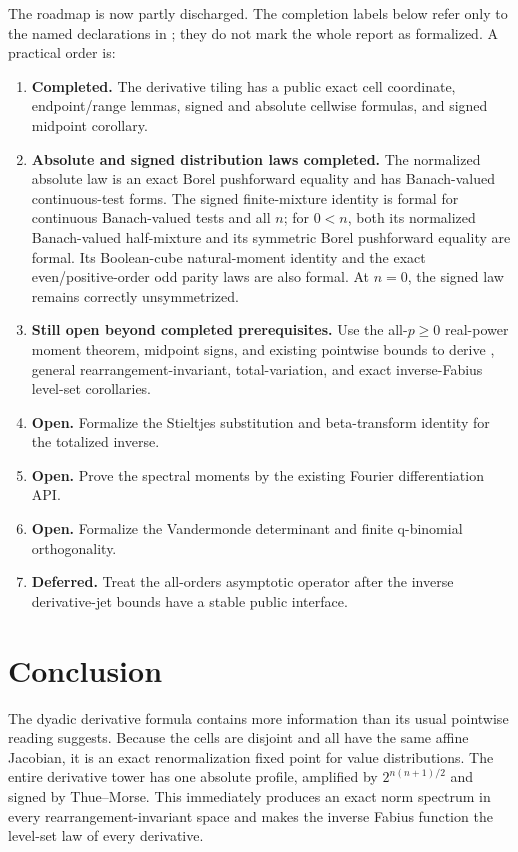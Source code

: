 \documentclass[11pt,oneside]{article}
\theoremstyle{definition}
\theoremstyle{remark}
\begin{document}
The roadmap is now partly discharged.  The completion labels below refer only to the named
declarations in ; they do not mark the whole report
as formalized.  A practical order is:
\begin{enumerate}
\item \textbf{Completed.}  The derivative tiling has a public exact cell coordinate,
      endpoint/range lemmas, signed and absolute cellwise formulas, and signed midpoint
      corollary.
\item \textbf{Absolute and signed distribution laws completed.}  The normalized absolute
      law is an exact Borel pushforward equality and has Banach-valued continuous-test forms.
      The signed finite-mixture identity is formal for continuous Banach-valued tests and all
      \(n\); for \(0<n\), both its normalized Banach-valued half-mixture and its symmetric
      Borel pushforward equality are formal.  Its Boolean-cube natural-moment identity and
      the exact even/positive-order odd parity laws are also formal.  At \(n=0\), the signed
      law remains correctly unsymmetrized.
\item \textbf{Still open beyond completed prerequisites.}  Use the all-\(p\ge0\)
      real-power moment theorem, midpoint signs, and existing pointwise bounds to derive
      , general rearrangement-invariant, total-variation, and exact
      inverse-Fabius level-set corollaries.
\item \textbf{Open.}  Formalize the Stieltjes substitution and beta-transform identity for
      the totalized inverse.
\item \textbf{Open.}  Prove the spectral moments by the existing Fourier differentiation
      API.
\item \textbf{Open.}  Formalize the Vandermonde determinant and finite q-binomial
      orthogonality.
\item \textbf{Deferred.}  Treat the all-orders asymptotic operator after the inverse
      derivative-jet bounds have a stable public interface.
\end{enumerate}

\section{Conclusion}

The dyadic derivative formula contains more information than its usual pointwise reading
suggests.  Because the cells are disjoint and all have the same affine Jacobian, it is an
exact renormalization fixed point for value distributions.  The entire derivative tower has
one absolute profile, amplified by $2^{n(n+1)/2}$ and signed by Thue--Morse.  This immediately
produces an exact norm spectrum in every rearrangement-invariant space and makes the inverse
Fabius function the level-set law of every derivative.
\end{document}
